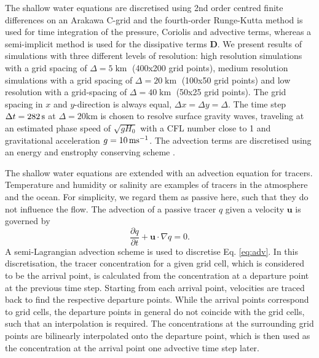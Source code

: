 The shallow water equations are discretised using 2nd order centred finite differences on an Arakawa C-grid \citep{Arakawa1977}
and the fourth-order Runge-Kutta method \citep{Butcher2016} is used for time integration of the pressure, Coriolis and advective terms,
whereas a semi-implicit method is used for the dissipative terms $\mathbf{D}$. We present results of simulations with three different
levels of resolution: high resolution simulations with a grid spacing of $\Delta = 5\operatorname{km}$ (400x200 grid points), medium
resolution simulations with a grid spacing of $\Delta = 20\operatorname{km}$ (100x50 grid points) and low resolution with a
grid-spacing of $\Delta = 40\operatorname{km}$ (50x25 grid points). The grid spacing in $x$ and $y$-direction is always equal,
$\Delta x = \Delta y = \Delta$. The time step $\Delta t = 282\operatorname{s}$ at $\Delta = 20\mathrm{km}$ is chosen to resolve surface gravity waves,
traveling at an estimated phase speed of $\sqrt{gH_0}$ with a CFL number close to 1 and gravitational acceleration $g=10\operatorname{ms}^{-1}$.
The advection terms are discretised using an energy and enstrophy conserving scheme \citep{Arakawa1990,Salmon2004,Salmon2007}.

The shallow water equations are extended with an advection equation for tracers. Temperature and humidity or salinity are examples
of tracers in the atmosphere and the ocean. For simplicity, we regard them as passive here, such that they do not influence the flow.
The advection of a passive tracer $q$ given a velocity $\mathbf{u}$ is governed by
\begin{equation}
\frac{\partial q}{\partial t} + \mathbf{u} \cdot \nabla q = 0.
\label{eq:adv}
\end{equation}
A semi-Lagrangian advection scheme \citep{Smolarkiewicz1992} is used to discretise Eq. \ref{eq:adv}. In this discretisation, the tracer
concentration for a given grid cell, which is considered to be the arrival point, is calculated from the concentration at a departure point
at the previous time step. Starting from each arrival point, velocities are traced back to find the respective departure points. 
While the arrival points correspond to grid cells, the departure points in general do not coincide with the grid cells, such that an interpolation
is required. The concentrations at the surrounding grid points are bilinearly interpolated onto the departure point, which
is then used as the concentration at the arrival point one advective time step later.

